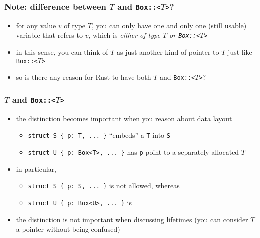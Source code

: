 \documentclass[12pt,dvipdfmx]{beamer}
\newcommand{\mura}[1]{{\color{purple}#1}}
\newcommand{\ao}[1]{{\color{blue}#1}}
\begin{document}
\begin{frame}
  \frametitle{Note: difference between $T$ and {\tt Box::<$T$>}?}
  \begin{itemize}
  \item for any value $v$ of type $T$, you can only have one
    and only one (still usable) variable that refers to $v$,
    which is {\it either of type \ao{$T$} or \mura{\tt Box::<$T$>}}
  \item in this sense, you can think of $T$
    as just another kind of pointer to $T$ just like \mura{\tt Box::<$T$>}
  \item so is there any reason for Rust to have
    both \ao{$T$} and \mura{\tt Box::<$T$>}?
  \end{itemize}
\end{frame}
    
\begin{frame}
  \frametitle{$T$ and {\tt Box::<$T$>}}
  \begin{itemize}
  \item the distinction becomes important when you reason about data layout
    \begin{itemize}
    \item {\tt struct S \{ p: \ao{T}, ... \}} ``embeds'' a {\tt T} into {\tt S}
    \item {\tt struct U \{ p: \mura{Box<T>}, ... \}}
      has {\tt p} point to a separately allocated $T$
    \end{itemize}
  \item in particular, 
    \begin{itemize}
    \item {\tt struct S \{ p: \ao{S}, ... \}} is not allowed, whereas
    \item {\tt struct U \{ p: \mura{Box<U>}, ... \}} is
    \end{itemize}
  \item the distinction is not important when discussing lifetimes
    (you can consider $T$ a pointer without being confused)
  \end{itemize}
\end{frame}
\end{document}
